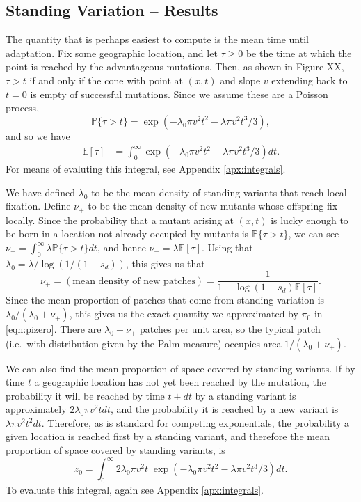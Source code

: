 \documentclass{article}
\renewcommand{\P}{\mathbb{P}}
\newcommand{\E}{\mathbb{E}}
\begin{document}
\subsection{Standing Variation -- Results} 

The quantity that is perhaps easiest to compute is the mean time until adaptation.
Fix some geographic location, and let $\tau\ge0$ be the time at which the point is reached by the advantageous mutations.
Then, as shown in Figure XX,
$\tau > t$ if and only if the cone with point at $(x,t)$ and slope $v$ extending back to $t=0$ is empty of successful mutations.
Since we assume these are a Poisson process, 
\[
    \P\{ \tau > t \} = \exp\left( - \lambda_0 \pi v^2 t^2 - \lambda \pi v^2 t^3 / 3 \right) ,
\]
and so we have
\begin{align}
    \E[\tau] %
        &= \int_0^\infty \exp\left( - \lambda_0 \pi v^2 t^2 - \lambda \pi v^2 t^3 / 3 \right) dt.
\end{align}
For means of evaluting this integral, see Appendix \ref{apx:integrals}.


We have defined $\lambda_0$ to be the mean density of standing variants that reach local fixation.
Define $\nu_+$ to be the mean density of new mutants whose offspring fix locally.
Since the probability that a mutant arising at $(x,t)$ is lucky enough to be born in a location not already occupied by mutants
is $\P\{ \tau > t \}$,
we can see  $\nu_+ = \int_0^\infty \lambda \P\{\tau>t\} dt$, and hence
$\nu_+ = \lambda \E[\tau] $.
Using that $\lambda_0 = \lambda / \log(1/(1-s_d))$, this gives us that
\begin{equation}
    \nu_+ = (\mbox{mean density of new patches}) = \frac{1}{1-\log(1-s_d) \E[\tau]} .
\end{equation}
Since the mean proportion of patches that come from standing variation is $\lambda_0 / (\lambda_0 + \nu_+)$,
this gives us the exact quantity we approximated by $\pi_0$ in \eqref{eqn:pizero}.
There are $\lambda_0 + \nu_+$ patches per unit area, so
the typical patch (i.e.\ with distribution given by the Palm measure) occupies area $1/(\lambda_0 + \nu_+)$.

We can also find the mean proportion of space covered by standing variants.
If by time $t$ a geographic location has not yet been reached by the mutation,
the probability it will be reached by time $t+dt$ 
by a standing variant is approximately $2 \lambda_0 \pi v^2 t dt$, 
and the probability it is reached by a new variant is $\lambda \pi v^2 t^2 dt$.
Therefore, as is standard for competing exponentials,
the probability a given location is reached first by a standing variant,
and therefore the mean proportion of space covered  by standing variants,
is
\begin{equation}
    z_0 = \int_0^\infty {2 \lambda_0 \pi v^2 t} \; \exp \left( - \lambda_0 \pi v^2 t^2 - \lambda \pi v^2 t^3 / 3 \right) dt .
\end{equation}
To evaluate this integral, again see Appendix \ref{apx:integrals}.
\end{document}
